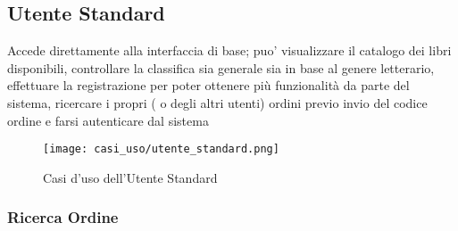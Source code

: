 \documentclass[a4paper, 10pt]{article}
\begin{document}
		\subsection{Utente Standard}
			Accede direttamente alla interfaccia di base; puo' visualizzare il catalogo dei 
			libri disponibili, controllare la classifica sia generale sia in base al genere 
			letterario, effettuare la registrazione per poter ottenere più funzionalità 
			da parte del sistema, ricercare i propri ( o degli altri utenti) ordini previo 
			invio del codice ordine e farsi autenticare dal sistema
			\begin{figure}[h]
				\centering
				\texttt{[image: casi\_uso/utente\_standard.png]}
				\caption{Casi d'uso dell'Utente Standard}
			\end{figure}
		\newpage
			\subsubsection{Ricerca Ordine}
\end{document}
